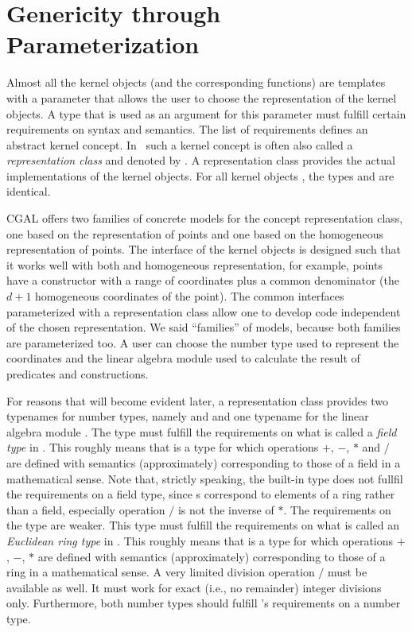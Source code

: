 \section{Genericity through Parameterization}
Almost all the kernel objects (and the corresponding functions) are
templates with a parameter that allows the user to choose the
representation of the kernel objects. A type that is used as an
argument for this parameter must fulfill certain requirements on
syntax and semantics. The list of requirements defines an abstract
kernel concept. In \cgal\ such a kernel concept is often also called a
\emph{representation class} and denoted by . A representation
class provides the actual implementations of the kernel objects.  For
all kernel objects , the types
 and  are identical.

CGAL offers two families of concrete models for the concept
representation class, one based on the 
representation of points and one based on the homogeneous
representation of points.  The interface of the kernel objects is
designed such that it works well with both
 and homogeneous representation, for
example, points have a constructor with a range of coordinates plus a
common denominator (the $d+1$ homogeneous coordinates of the point).
The common interfaces parameterized with a representation class allow
one to develop code independent of the chosen representation.  We said
``families'' of models, because both families are parameterized too.
A user can choose the number type used to represent the coordinates
and the linear algebra module used to calculate the result of
predicates and constructions.

For reasons that will become evident later, a representation class
provides two typenames for number types,
namely  and  and one typename for the linear
algebra module .%
 The type  must fulfill the
requirements on what is called a {\em field type} in \cgal. This
roughly means that  is a type for which operations $+$,
$-$, $*$ and $/$ are defined with semantics (approximately)
corresponding to those of a field in a mathematical sense. Note that,
strictly speaking, the built-in type  does not fullfil the
requirements on a field type, since s correspond to elements
of a ring rather than a field, especially operation $/$ is not the
inverse of $*$.  The requirements on the type  are
weaker.  This type must fulfill the requirements on what is called an
{\em Euclidean ring type} in \cgal. This roughly means that
 is a type for which operations $+$, $-$, $*$ are
defined with semantics (approximately) corresponding to those of a
ring in a mathematical sense.  A very limited division operation $/$
must be available as well.  It must work for exact (i.e., no
remainder) integer divisions only.  Furthermore, both number types
should fulfill \cgal's requirements on a number type.  

